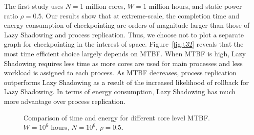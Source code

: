 The first study uses $N=1$ million cores, %
$W=1$ million hours, and static power ratio $\rho=0.5$.
Our results show that at extreme-scale, the completion time and energy consumption of checkpointing are orders of magnitude larger than those of Lazy Shadowing and process replication. Thus, we choose not to plot a separate graph for checkpointing in the interest of space. 
Figure~\ref{fig:t32} reveals that the most time efficient choice largely depends on MTBF. 
When MTBF is high, Lazy Shadowing requires less time as more cores are used for main processes and less workload is assigned to each process. As MTBF decreases, process replication outperforms Lazy Shadowing as a result of the increased likelihood of rollback for Lazy Shadowing.
In terms of energy consumption, Lazy Shadowing has much more advantage over process replication. %

\begin{figure}[!t]
	\captionsetup{justification=centering}
	\begin{center} 
		\caption{Comparison of time and energy for different core level MTBF. $W=10^6$ hours, $N=10^6$, $\rho=0.5$.}
	\end{center}
	\label{fig:com3}
\end{figure}

